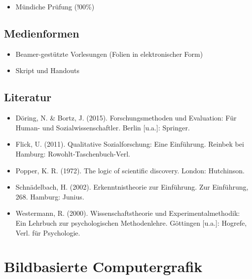 \begin{itemize}
\tightlist
\item
  Mündiche Prüfung (!00\%)
\end{itemize}

\section*{Medienformen\label{/mi-2017/modulbeschreibungen-master/MA_SC_WPF_eScience}}\label{medienformenpathlabelmi-2017modulbeschreibungen-mastermaux5fscux5fwpfux5fescience}

\begin{itemize}
\tightlist
\item
  Beamer-gestützte Vorlesungen (Folien in elektronischer Form)
\item
  Skript und Handouts
\end{itemize}

\section*{Literatur\label{/mi-2017/modulbeschreibungen-master/MA_SC_WPF_eScience}}\label{literaturpathlabelmi-2017modulbeschreibungen-mastermaux5fscux5fwpfux5fescience}

\begin{itemize}
\tightlist
\item
  Döring, N. \& Bortz, J. (2015). Forschungsmethoden und Evaluation: Für
  Human- und Sozialwissenschaftler. Berlin {[}u.a.{]}: Springer.
\item
  Flick, U. (2011). Qualitative Sozialforschung: Eine Einführung.
  Reinbek bei Hamburg: Rowohlt-Taschenbuch-Verl.
\item
  Popper, K. R. (1972). The logic of scientific discovery. London:
  Hutchinson.
\item
  Schnädelbach, H. (2002). Erkenntnistheorie zur Einführung. Zur
  Einführung, 268. Hamburg: Junius.
\item
  Westermann, R. (2000). Wissenschaftstheorie und Experimentalmethodik:
  Ein Lehrbuch zur psychologischen Methodenlehre. Göttingen {[}u.a.{]}:
  Hogrefe, Verl. für Psychologie.
\end{itemize}

\chapter{Bildbasierte
Computergrafik\label{/mi-2017/modulbeschreibungen-master/MA_VC_Modul_BildbasierteComputergrafik}}\label{bildbasierte-computergrafikpathlabelmi-2017modulbeschreibungen-mastermaux5fvcux5fmodulux5fbildbasiertecomputergrafik}

